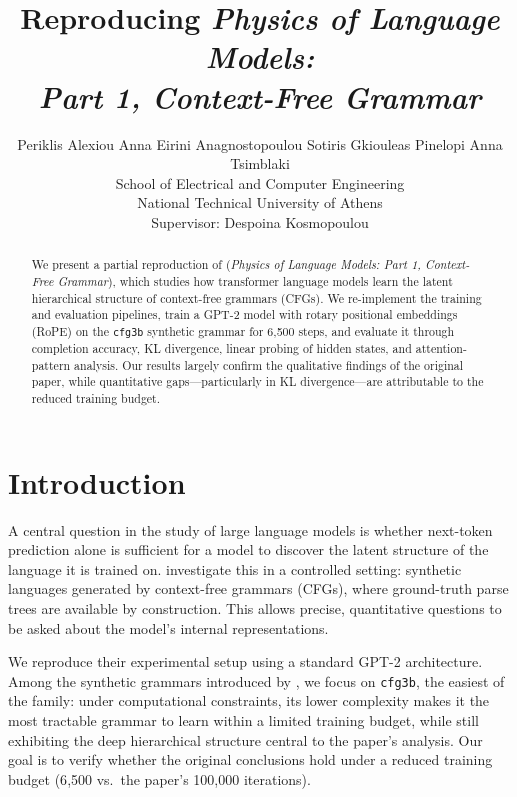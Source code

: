 \documentclass[10pt,twocolumn]{article}
\title{\textbf{Reproducing \emph{Physics of Language Models:\\Part 1, Context-Free Grammar}}}
\author{
  Periklis Alexiou \quad
  Anna Eirini Anagnostopoulou \quad
  Sotiris Gkiouleas \quad
  Pinelopi Anna Tsimblaki \\[4pt]
  School of Electrical and Computer Engineering \\
  National Technical University of Athens \\[4pt]
  \small Supervisor: Despoina Kosmopoulou
}
\date{}
\begin{document}
\maketitle

\begin{abstract}
We present a partial reproduction of \citet{allen-zhu2023physics} (\emph{Physics of Language Models: Part 1, Context-Free Grammar}), which studies how transformer language models learn the latent hierarchical structure of context-free grammars (CFGs). We re-implement the training and evaluation pipelines, train a GPT-2 model with rotary positional embeddings (RoPE) on the \texttt{cfg3b} synthetic grammar for 6{,}500 steps, and evaluate it through completion accuracy, KL divergence, linear probing of hidden states, and attention-pattern analysis. Our results largely confirm the qualitative findings of the original paper, while quantitative gaps—particularly in KL divergence—are attributable to the reduced training budget.
\end{abstract}

\section{Introduction}
\label{sec:intro}

A central question in the study of large language models is whether next-token prediction alone is sufficient for a model to discover the latent structure of the language it is trained on. \citet{allen-zhu2023physics} investigate this in a controlled setting: synthetic languages generated by context-free grammars (CFGs), where ground-truth parse trees are available by construction. This allows precise, quantitative questions to be asked about the model's internal representations.

We reproduce their experimental setup using a standard GPT-2 architecture. Among the synthetic grammars introduced by \citet{allen-zhu2023physics}, we focus on \texttt{cfg3b}, the easiest of the family: under computational constraints, its lower complexity makes it the most tractable grammar to learn within a limited training budget, while still exhibiting the deep hierarchical structure central to the paper's analysis. Our goal is to verify whether the original conclusions hold under a reduced training budget (6{,}500 vs.\ the paper's 100{,}000 iterations).
\end{document}
